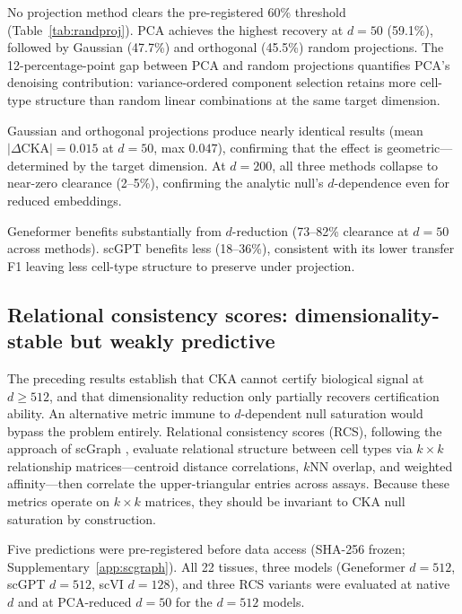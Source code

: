 \documentclass[11pt]{article}
\begin{document}
No projection method clears the pre-registered 60\% threshold
(Table~\ref{tab:randproj}). PCA achieves the highest recovery at
$d = 50$ (59.1\%), followed by Gaussian (47.7\%) and orthogonal
(45.5\%) random projections. The 12-percentage-point gap between PCA
and random projections quantifies PCA's denoising contribution:
variance-ordered component selection retains more cell-type structure
than random linear combinations at the same target dimension.

Gaussian and orthogonal projections produce nearly identical results
(mean $|\Delta\text{CKA}| = 0.015$ at $d = 50$, max $0.047$),
confirming that the effect is geometric---determined by the target
dimension. At $d = 200$, all three methods collapse to near-zero
clearance (2--5\%), confirming the analytic null's $d$-dependence even for
reduced embeddings.

Geneformer benefits substantially from $d$-reduction (73--82\% clearance
at $d = 50$ across methods). scGPT benefits less (18--36\%), consistent
with its lower transfer F1 leaving less cell-type structure to preserve
under projection.


\subsection{Relational consistency scores: dimensionality-stable but weakly predictive}
\label{sec:scgraph}

The preceding results establish that CKA cannot certify biological
signal at $d \geq 512$, and that dimensionality reduction only
partially recovers certification ability. An alternative metric immune
to $d$-dependent null saturation would bypass the problem entirely.
Relational consistency scores (RCS), following the approach of scGraph
\citep{wang2026scgraph}, evaluate relational structure between cell
types via $k \times k$ relationship matrices---centroid distance
correlations, $k$NN overlap, and weighted affinity---then correlate the
upper-triangular entries across assays. Because these metrics operate on
$k \times k$ matrices, they should be invariant to CKA null saturation
by construction.

Five predictions were pre-registered before data access (SHA-256
frozen; Supplementary~\ref{app:scgraph}). All 22 tissues, three
models (Geneformer $d = 512$, scGPT $d = 512$, scVI $d = 128$), and
three RCS variants were evaluated at native $d$ and at PCA-reduced
$d = 50$ for the $d = 512$ models.
\end{document}
